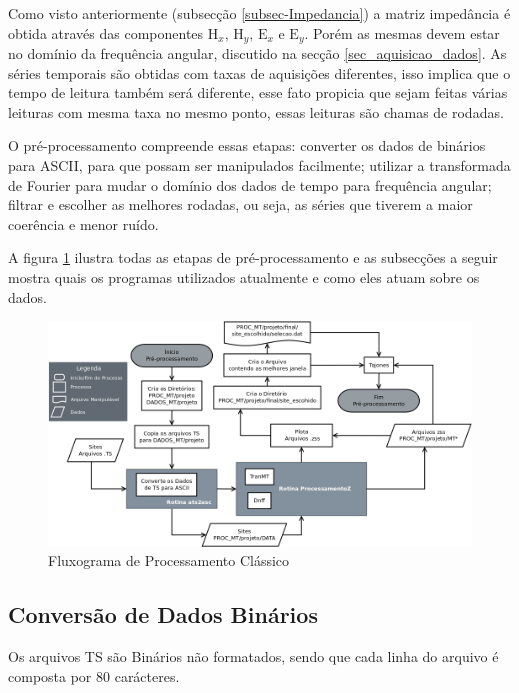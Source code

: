         Como visto anteriormente (subsecção \ref{subsec-Impedancia}) a matriz impedância é obtida através das componentes $\textrm{H}_x,\, \textrm{H}_y,  \, \textrm{E}_x \, \, \textrm{e} \, \, \textrm{E}_y$. Porém as mesmas devem estar no domínio da frequência angular, discutido na secção \ref{sec_aquisicao_dados}. As séries temporais são obtidas com taxas de aquisições diferentes, isso implica que o tempo de leitura também será diferente, esse fato propicia que sejam feitas várias leituras com mesma taxa no mesmo ponto, essas leituras são chamas de rodadas. 
        
        O pré-processamento compreende essas etapas: converter os dados de binários para ASCII, para que possam ser manipulados facilmente; utilizar a transformada de Fourier para mudar o domínio dos dados de tempo para frequência angular; filtrar e escolher as melhores rodadas, ou seja, as séries que tiverem a maior coerência e menor ruído.
        
        A figura \ref{fig_fluxo_classico} ilustra todas as etapas de pré-processamento e as subsecções a seguir mostra quais os programas utilizados atualmente e como eles atuam sobre os dados.  
    
        
    \begin{figure}[H]
                \caption{Fluxograma de Processamento Clássico}
                \begin{center}
                    \includegraphics[width=16cm]{texto/fig/fluxograma.png} \end{center}
                \label{fig_fluxo_classico} 
            \end{figure}
 
    \subsection{Conversão de Dados Binários}
    \label{subsec-conver-dados}
    Os arquivos TS são Binários não formatados, sendo que cada linha do arquivo é composta por 80 carácteres. 
    
